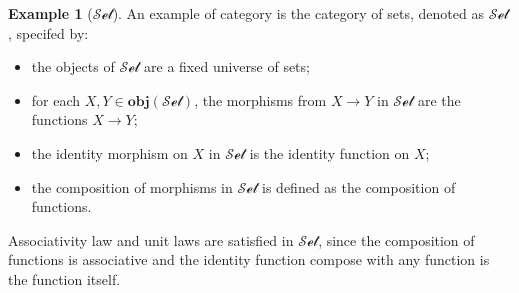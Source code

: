 \documentclass[12pt,twoside,a4paper]{report}
\theoremstyle{definition}
\theoremstyle{definition}
\theoremstyle{definition}
\newtheorem{example}{Example}
\theoremstyle{definition}
\begin{document}
        \begin{example}[$\mathcal{Set}$]
            An example of category is the category of sets, denoted as $\mathcal{Set}$, specifed by:
            \begin{itemize}
                \item 
                    the objects of $\mathcal{Set}$ are a fixed universe of sets;
                \item
                    for each $X, Y \in \textbf{obj}(\mathcal{Set})$, the morphisms from $X \to Y$ in $\mathcal{Set}$ are the functions $X \to Y$;
                \item
                    the identity morphism on $X$ in $\mathcal{Set}$ is the identity function on $X$;
                \item
                    the composition of morphisms in $\mathcal{Set}$ is defined as the composition of functions.
            \end{itemize}
            Associativity law and unit laws are satisfied in $\mathcal{Set}$, since the composition of functions is associative and the identity function compose with any function is the function itself.
        \end{example}
\end{document}
